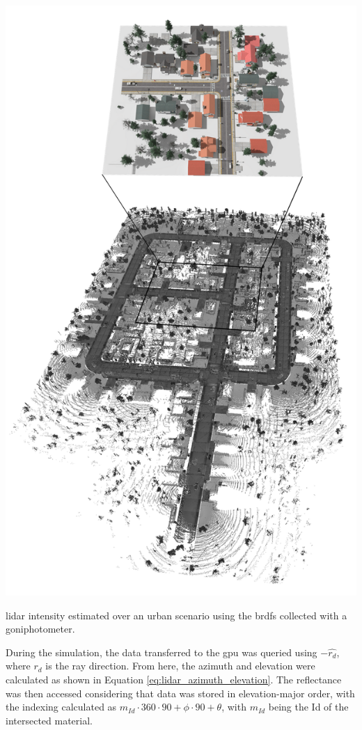 \begin{marginfigure}[-2.0cm]
    \centering
    \includegraphics[width=\linewidth]{figs/lidar_intensity/material_database_intensity_results.png}
    \caption{\acrshort{lidar} intensity estimated over an urban scenario using the \acrshort{brdf}s collected with a goniphotometer.}
	\label{fig:lidar_material_database_intensity_result}
\end{marginfigure}
During the simulation, the data transferred to the \acrshort{gpu} was queried using $-\widehat{r_d}$, where $r_d$ is the ray direction. From here, the azimuth and elevation were calculated as shown in Equation \ref{eq:lidar_azimuth_elevation}. The reflectance was then accessed considering that data was stored in elevation-major order, with the indexing calculated as $m_{\textit{Id}} \cdot 360 \cdot 90 + \phi \cdot 90 + \theta$, with $m_{\textit{Id}}$ being the Id of the intersected material.
